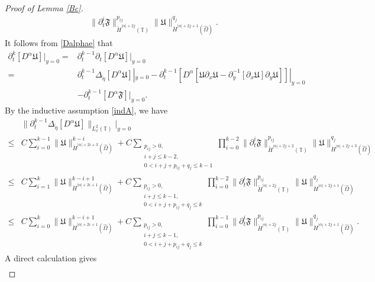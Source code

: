 \documentclass{amsart}
\numberwithin{equation}{section}
\begin{document}
\begin{proof}[Proof of Lemma \ref{Bc}]
\begin{align}
      \|\partial_{t}^{i}\mathfrak{F}\|_{\mathring{H}^{|\alpha|+2j}(\mathbb{T})}^{p_{ij}}
      \|\mathfrak{U}\|_{\ddot{H}^{|\alpha|+2j+1}(\hat{\Omega})}^{q_{j}}.
\end{align}
It follows from \eqref{Dalphae} that
\begin{align}\label{Dkalphae}
\partial_{t}^{k}[D^{\alpha}\mathfrak{U}]|_{y=0}
=&\partial_{t}^{k-1}\partial_{t}[D^{\alpha}\mathfrak{U}]|_{y=0}\\
=& \partial_{t}^{k-1}\Delta_{\tilde{\eta}}[D^{\alpha}\mathfrak{U}]|_{y=0}
  -\partial_{t}^{k-1}\left[D^{\alpha}[\mathfrak{U}\partial_{x}\mathfrak{U}-\partial_{y}^{-1}[\partial_{x}\mathfrak{U}]\partial_{y}\mathfrak{U}]\right]|_{y=0}\nonumber\\
 &-\partial_{t}^{k-1}[D^{\alpha}\mathfrak{F}]|_{y=0}.\nonumber
\end{align}
By the inductive assumption \eqref{indA}, we have
\begin{align}\label{Dkalpha1}
&\|\partial_{t}^{k-1}\Delta_{\tilde{\eta}}[D^{\alpha}\mathfrak{U}]\|_{L_{x}^{2}(\mathbb{T})}|_{y=0}\\
\leq& C\sum_{i=0}^{k-1}\|\mathfrak{U}\|_{\ddot{H}^{|\alpha|+2i+3}(\hat{\Omega})}^{k-i}
     +C\sum_{\substack{p_{ij}>0,\\ i+j\leq k-2,\\0<i+j+p_{ij}+q_{j}\leq k-1}}\prod_{i=0}^{k-2}
      \|\partial_{t}^{i}\mathfrak{F}\|_{\mathring{H}^{|\alpha|+2j+2}(\mathbb{T})}^{p_{ij}}
      \|\mathfrak{U}\|_{\ddot{H}^{|\alpha|+2j+3}(\hat{\Omega})}^{q_{j}}\nonumber\\
\leq& C\sum_{i=1}^{k}\|\mathfrak{U}\|_{\ddot{H}^{|\alpha|+2i+1}(\hat{\Omega})}^{k-i+1}
     +C\sum_{\substack{p_{ij}>0,\\ i+j\leq k-1,\\0<i+j+p_{ij}+q_{j}\leq k}}\prod_{i=0}^{k-2}
      \|\partial_{t}^{i}\mathfrak{F}\|_{\mathring{H}^{|\alpha|+2j}(\mathbb{T})}^{p_{ij}}
      \|\mathfrak{U}\|_{\ddot{H}^{|\alpha|+2j+1}(\hat{\Omega})}^{q_{j}}\nonumber\\
\leq& C\sum_{i=0}^{k}\|\mathfrak{U}\|_{\ddot{H}^{|\alpha|+2i+1}(\hat{\Omega})}^{k-i+1}
     +C\sum_{\substack{p_{ij}>0,\\ i+j\leq k-1,\\0<i+j+p_{ij}+q_{j}\leq k}}\prod_{i=0}^{k-1}
      \|\partial_{t}^{i}\mathfrak{F}\|_{\mathring{H}^{|\alpha|+2j}(\mathbb{T})}^{p_{ij}}
      \|\mathfrak{U}\|_{\ddot{H}^{|\alpha|+2j+1}(\hat{\Omega})}^{q_{j}}.\nonumber
\end{align}
A direct calculation gives
\begin{align}\label{Dkalpha20}

\end{align}
\end{proof}
\end{document}
